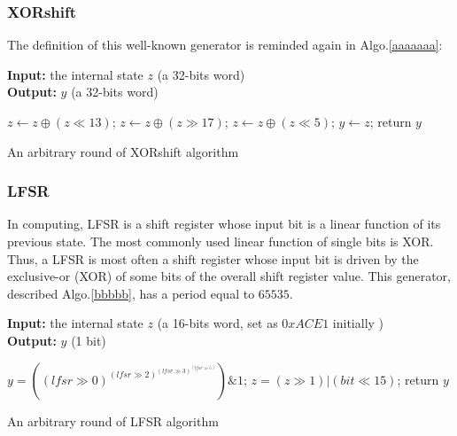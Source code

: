 \subsubsection{XORshift}
The definition of this well-known generator is reminded again in Algo.\ref{aaaaaaa}: 
\begin{algorithm}
\textbf{Input:} the internal state $z$ (a 32-bits word)\\
\textbf{Output:} $y$ (a 32-bits word)
\begin{algorithmic}[1]

\STATE$z\leftarrow{z\oplus{(z\ll13)}}$;
\STATE$z\leftarrow{z\oplus{(z\gg17)}}$;
\STATE$z\leftarrow{z\oplus{(z\ll5)}}$;
\STATE$y\leftarrow{z}$;
\STATE return $y$\;
\medskip
\caption{An arbitrary round of XORshift algorithm}
\label{aaaaaaa}
\end{algorithmic}
\end{algorithm}

\subsubsection{LFSR}
In computing, LFSR is a shift register whose input bit is a linear function of its previous state. The most commonly used linear function of single bits is XOR. Thus, a LFSR is most often a shift register whose input bit is driven by the exclusive-or (XOR) of some bits of the overall shift register value. This generator, 
described Algo.\ref{bbbbb}, has a period equal to $65535$.

\begin{algorithm}
\textbf{Input:} the internal state $z$ (a 16-bits word, set as $0xACE1$ initially )\\
\textbf{Output:} $y$ (1 bit)
\begin{algorithmic}[1]
\STATE$y = ((lfsr \gg 0) ^ (lfsr \gg 2) ^ (lfsr \gg 3) ^ (lfsr \gg 5) ) \& 1$;
\STATE$z = (z \gg 1) | (bit \ll 15)$;
\STATE return $y$\;
\medskip
\caption{An arbitrary round of LFSR algorithm}
\label{bbbbb}
\end{algorithmic}
\end{algorithm}


